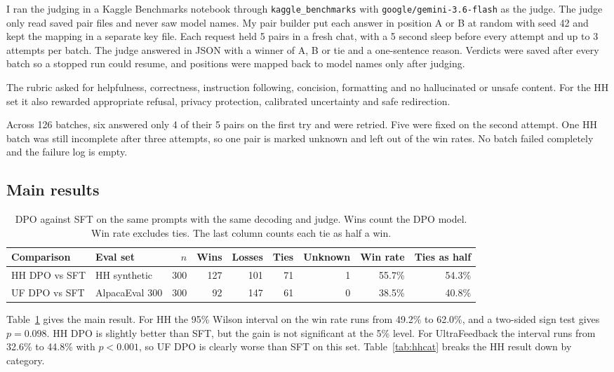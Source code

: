 \documentclass[11pt]{article}
\newcommand{\brk}{\allowbreak}
\begin{document}
I ran the judging in a Kaggle Benchmarks notebook through \texttt{kaggle\_benchmarks} with \texttt{google/\brk gemini-3.6-flash} as the judge.
The judge only read saved pair files and never saw model names.
My pair builder put each answer in position A or B at random with seed 42 and kept the mapping in a separate key file.
Each request held 5 pairs in a fresh chat, with a 5 second sleep before every attempt and up to 3 attempts per batch.
The judge answered in JSON with a winner of A, B or tie and a one-sentence reason.
Verdicts were saved after every batch so a stopped run could resume, and positions were mapped back to model names only after judging.

The rubric asked for helpfulness, correctness, instruction following, concision, formatting and no hallucinated or unsafe content.
For the HH set it also rewarded appropriate refusal, privacy protection, calibrated uncertainty and safe redirection.

Across 126 batches, six answered only 4 of their 5 pairs on the first try and were retried.
Five were fixed on the second attempt.
One HH batch was still incomplete after three attempts, so one pair is marked unknown and left out of the win rates.
No batch failed completely and the failure log is empty.

\subsection{Main results}

\begin{table}[htbp]
\centering\small
\begin{tabular}{l l r r r r r r r}
\toprule
Comparison & Eval set & $n$ & Wins & Losses & Ties & Unknown & Win rate & Ties as half \\
\midrule
HH DPO vs SFT & HH synthetic & 300 & 127 & 101 & 71 & 1 & 55.7\% & 54.3\% \\
UF DPO vs SFT & AlpacaEval 300 & 300 & 92 & 147 & 61 & 0 & 38.5\% & 40.8\% \\
\bottomrule
\end{tabular}
\caption{DPO against SFT on the same prompts with the same decoding and judge. Wins count the DPO model. Win rate excludes ties. The last column counts each tie as half a win.}
\label{tab:main}
\end{table}

Table~\ref{tab:main} gives the main result.
For HH the 95\% Wilson interval on the win rate runs from 49.2\% to 62.0\%, and a two-sided sign test gives $p=0.098$.
HH DPO is slightly better than SFT, but the gain is not significant at the 5\% level.
For UltraFeedback the interval runs from 32.6\% to 44.8\% with $p<0.001$, so UF DPO is clearly worse than SFT on this set.
Table~\ref{tab:hhcat} breaks the HH result down by category.
\end{document}
